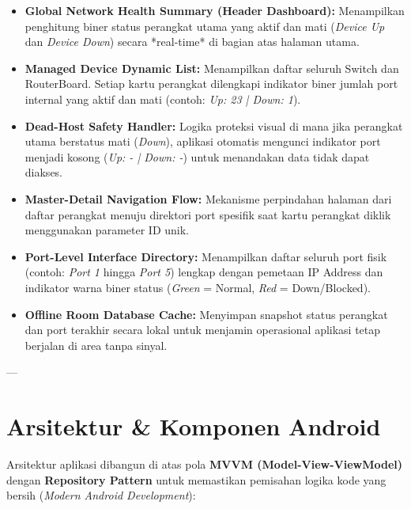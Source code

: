 \documentclass[12pt,titlepage]{article}
\begin{document}
\begin{itemize}
    \item \textbf{Global Network Health Summary (Header Dashboard):} Menampilkan penghitung biner status perangkat utama yang aktif dan mati (\textit{Device Up} dan \textit{Device Down}) secara *real-time* di bagian atas halaman utama.
    \item \textbf{Managed Device Dynamic List:} Menampilkan daftar seluruh Switch dan RouterBoard. Setiap kartu perangkat dilengkapi indikator biner jumlah port internal yang aktif dan mati (contoh: \textit{Up: 23 | Down: 1}).
    \item \textbf{Dead-Host Safety Handler:} Logika proteksi visual di mana jika perangkat utama berstatus mati (\textit{Down}), aplikasi otomatis mengunci indikator port menjadi kosong (\textit{Up: - | Down: -}) untuk menandakan data tidak dapat diakses.
    \item \textbf{Master-Detail Navigation Flow:} Mekanisme perpindahan halaman dari daftar perangkat menuju direktori port spesifik saat kartu perangkat diklik menggunakan parameter ID unik.
    \item \textbf{Port-Level Interface Directory:} Menampilkan daftar seluruh port fisik (contoh: \textit{Port 1} hingga \textit{Port 5}) lengkap dengan pemetaan IP Address dan indikator warna biner status (\textit{Green} = Normal, \textit{Red} = Down/Blocked).
    \item \textbf{Offline Room Database Cache:} Menyimpan snapshot status perangkat dan port terakhir secara lokal untuk menjamin operasional aplikasi tetap berjalan di area tanpa sinyal.
\end{itemize}

---

\section{Arsitektur \& Komponen Android}

Arsitektur aplikasi dibangun di atas pola \textbf{MVVM (Model-View-ViewModel)} dengan \textbf{Repository Pattern} untuk memastikan pemisahan logika kode yang bersih (\textit{Modern Android Development}):
\end{document}
